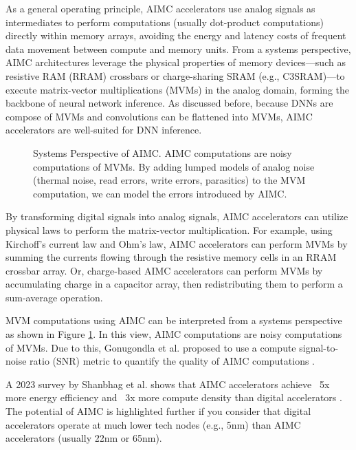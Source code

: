 As a general operating principle, AIMC accelerators use analog signals as intermediates to perform computations (usually dot-product computations) directly within memory arrays, avoiding the energy and latency costs of frequent data movement between compute and memory units. From a systems perspective, AIMC architectures leverage the physical properties of memory devices—such as resistive RAM (RRAM) crossbars or charge-sharing SRAM (e.g., C3SRAM)—to execute matrix-vector multiplications (MVMs) in the analog domain, forming the backbone of neural network inference. As discussed before, because DNNs are compose of MVMs and convolutions can be flattened into MVMs, AIMC accelerators are well-suited for DNN inference. 

\begin{figure}[htbp]
    \centering
    
    \caption{Systems Perspective of AIMC. AIMC computations are noisy computations of MVMs. By adding lumped models of analog noise (thermal noise, read errors, write errors, parasitics) to the MVM computation, we can model the errors introduced by AIMC.}
    \label{fig:aimc_system}
\end{figure}

By transforming digital signals into analog signals, AIMC accelerators can utilize physical laws to perform the matrix-vector multiplication. For example, using Kirchoff's current law and Ohm's law, AIMC accelerators can perform MVMs by summing the currents flowing through the resistive memory cells in an RRAM crossbar array. Or, charge-based AIMC accelerators can perform MVMs by accumulating charge in a capacitor array, then redistributing them to perform a sum-average operation.

MVM computations using AIMC can be interpreted from a systems perspective as shown in Figure \ref{fig:aimc_system}. In this view, AIMC computations are noisy computations of MVMs. Due to this, Gonugondla et al. proposed to use a compute signal-to-noise ratio (SNR) metric to quantify the quality of AIMC computations \cite{gonugondla2020fundamental}.  


A 2023 survey by Shanbhag et al. shows that AIMC accelerators achieve ~5x more energy efficiency and ~3x more compute density than digital accelerators \cite{shanbhag2022benchmarking}. The potential of AIMC is highlighted further if you consider that digital accelerators operate at much lower tech nodes (e.g., 5nm) than AIMC accelerators (usually 22nm or 65nm).

